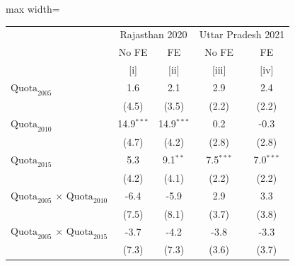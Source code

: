 
\begingroup
\centering
\scriptsize
\begin{adjustbox}{max width=\linewidth}
   \begin{threeparttable}[b]
      \begin{tabular}{lcccc}
         \toprule
          & \multicolumn{2}{c}{Rajasthan 2020} & \multicolumn{2}{c}{Uttar Pradesh 2021} \\
                                                                                                  & No FE        & FE           & No FE       & FE \\
                                                                                                  & [i]          & [ii]         & [iii]       & [iv]\\
         \midrule
         $\text{Quota}_{2005}$                                                                    & 1.6          & 2.1          & 2.9         & 2.4\\
                                                                                                  & (4.5)        & (3.5)        & (2.2)       & (2.2)\\
         $\text{Quota}_{2010}$                                                                    & 14.9$^{***}$ & 14.9$^{***}$ & 0.2         & -0.3\\
                                                                                                  & (4.7)        & (4.2)        & (2.8)       & (2.8)\\
         $\text{Quota}_{2015}$                                                                    & 5.3          & 9.1$^{**}$   & 7.5$^{***}$ & 7.0$^{***}$\\
                                                                                                  & (4.2)        & (4.1)        & (2.2)       & (2.2)\\
         $\text{Quota}_{2005}$ $\times$ $\text{Quota}_{2010}$                                     & -6.4         & -5.9         & 2.9         & 3.3\\
                                                                                                  & (7.5)        & (8.1)        & (3.7)       & (3.8)\\
         $\text{Quota}_{2005}$ $\times$ $\text{Quota}_{2015}$                                     & -3.7         & -4.2         & -3.8        & -3.3\\
                                                                                                  & (7.3)        & (7.3)        & (3.6)       & (3.7)\\

\end{tabular}
\end{threeparttable}
\end{adjustbox}
